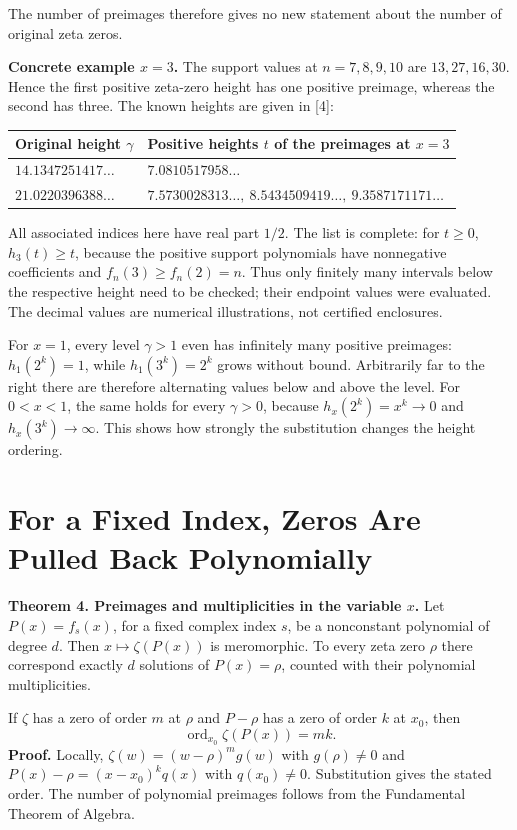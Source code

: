 \documentclass[11pt,a4paper]{article}
\begin{document}
The number of preimages therefore gives no new statement about the number of original zeta zeros.

\textbf{Concrete example $x=3$.} The support values at $n=7,8,9,10$ are $13,27,16,30$. Hence the first positive zeta-zero height has one positive preimage, whereas the second has three. The known heights are given in [4]:

\begin{center}
\begin{tabularx}{\linewidth}{@{}lX@{}}
\toprule
\textbf{Original height $\gamma$} & \textbf{Positive heights $t$ of the preimages at $x=3$}\\
\midrule
$14.1347251417\ldots$ & $7.0810517958\ldots$\\
$21.0220396388\ldots$ & $7.5730028313\ldots,\ 8.5434509419\ldots,\ 9.3587171171\ldots$\\
\bottomrule
\end{tabularx}
\end{center}

All associated indices here have real part $1/2$. The list is complete: for $t\ge0$, $h_3(t)\ge t$, because the positive support polynomials have nonnegative coefficients and $f_n(3)\ge f_n(2)=n$. Thus only finitely many intervals below the respective height need to be checked; their endpoint values were evaluated. The decimal values are numerical illustrations, not certified enclosures.

For $x=1$, every level $\gamma>1$ even has infinitely many positive preimages: $h_1(2^k)=1$, while $h_1(3^k)=2^k$ grows without bound. Arbitrarily far to the right there are therefore alternating values below and above the level. For $0<x<1$, the same holds for every $\gamma>0$, because $h_x(2^k)=x^k\to0$ and $h_x(3^k)\to\infty$. This shows how strongly the substitution changes the height ordering.

\section{For a Fixed Index, Zeros Are Pulled Back Polynomially}
\textbf{Theorem 4. Preimages and multiplicities in the variable $x$.}
Let $P(x)=f_s(x)$, for a fixed complex index $s$, be a nonconstant polynomial of degree $d$. Then $x\mapsto\zeta(P(x))$ is meromorphic. To every zeta zero $\rho$ there correspond exactly $d$ solutions of $P(x)=\rho$, counted with their polynomial multiplicities.

If $\zeta$ has a zero of order $m$ at $\rho$ and $P-\rho$ has a zero of order $k$ at $x_0$, then
\[
 \operatorname{ord}_{x_0}\zeta(P(x))=mk.
\]
\textbf{Proof.} Locally, $\zeta(w)=(w-\rho)^m g(w)$ with $g(\rho)\ne0$ and $P(x)-\rho=(x-x_0)^k q(x)$ with $q(x_0)\ne0$. Substitution gives the stated order. The number of polynomial preimages follows from the Fundamental Theorem of Algebra.
\end{document}
